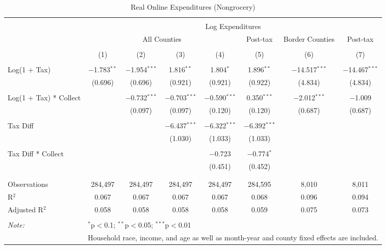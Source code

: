 
\begin{table}[!htbp] \centering 
  \caption{Real Online Expenditures (Nongrocery)} 
  \label{} 
\begin{tabular}{@{\extracolsep{5pt}}lccccccc} 
\\[-1.8ex]\hline 
\hline \\[-1.8ex] 
 & \multicolumn{7}{c}{Log Expenditures} \\ 
\cline{2-8} 
 & \multicolumn{4}{c}{All Counties} & Post-tax & Border Counties & Post-tax \\ 
\\[-1.8ex] & (1) & (2) & (3) & (4) & (5) & (6) & (7)\\ 
\hline \\[-1.8ex] 
 Log(1 + Tax) & $-$1.783$^{**}$ & $-$1.954$^{***}$ & 1.816$^{**}$ & 1.804$^{*}$ & 1.896$^{**}$ & $-$14.517$^{***}$ & $-$14.467$^{***}$ \\ 
  & (0.696) & (0.696) & (0.921) & (0.921) & (0.922) & (4.834) & (4.834) \\ 
  & & & & & & & \\ 
 Log(1 + Tax) * Collect &  & $-$0.732$^{***}$ & $-$0.703$^{***}$ & $-$0.590$^{***}$ & 0.350$^{***}$ & $-$2.012$^{***}$ & $-$1.009 \\ 
  &  & (0.097) & (0.097) & (0.120) & (0.120) & (0.687) & (0.687) \\ 
  & & & & & & & \\ 
 Tax Diff &  &  & $-$6.437$^{***}$ & $-$6.322$^{***}$ & $-$6.392$^{***}$ &  &  \\ 
  &  &  & (1.030) & (1.033) & (1.033) &  &  \\ 
  & & & & & & & \\ 
 Tax Diff * Collect &  &  &  & $-$0.723 & $-$0.774$^{*}$ &  &  \\ 
  &  &  &  & (0.451) & (0.452) &  &  \\ 
  & & & & & & & \\ 
\hline \\[-1.8ex] 
Observations & 284,497 & 284,497 & 284,497 & 284,497 & 284,595 & 8,010 & 8,011 \\ 
R$^{2}$ & 0.067 & 0.067 & 0.067 & 0.067 & 0.068 & 0.096 & 0.094 \\ 
Adjusted R$^{2}$ & 0.058 & 0.058 & 0.058 & 0.058 & 0.059 & 0.075 & 0.073 \\ 
\hline 
\hline \\[-1.8ex] 
\textit{Note:}  & \multicolumn{7}{l}{$^{*}$p$<$0.1; $^{**}$p$<$0.05; $^{***}$p$<$0.01} \\ 
 & \multicolumn{7}{l}{Household race, income, and age as well as month-year and county fixed effects are included.} \\ 
\end{tabular} 
\end{table} 
